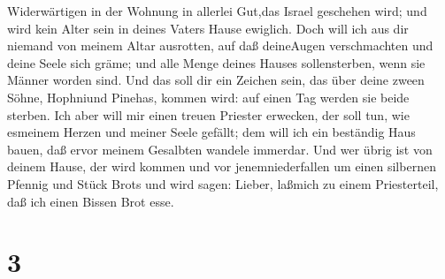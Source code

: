 Widerwärtigen in der Wohnung in allerlei Gut,das Israel geschehen wird;
und wird kein Alter sein in deines Vaters Hause ewiglich. 
Doch will ich aus dir niemand von meinem Altar ausrotten, auf daß
deineAugen verschmachten und deine Seele sich gräme; und alle Menge
deines Hauses sollensterben, wenn sie Männer worden sind. 
Und das soll dir ein Zeichen sein, das über deine zween Söhne, Hophniund
Pinehas, kommen wird: auf einen Tag werden sie beide sterben.
 Ich aber will mir einen treuen Priester erwecken, der soll
tun, wie esmeinem Herzen und meiner Seele gefällt; dem will ich ein
beständig Haus bauen, daß ervor meinem Gesalbten wandele immerdar.
 Und wer übrig ist von deinem Hause, der wird kommen und
vor jenemniederfallen um einen silbernen Pfennig und Stück Brots und
wird sagen: Lieber, laßmich zu einem Priesterteil, daß ich einen Bissen
Brot esse.

\hypertarget{section-2}{%
\section{3}\label{section-2}}

